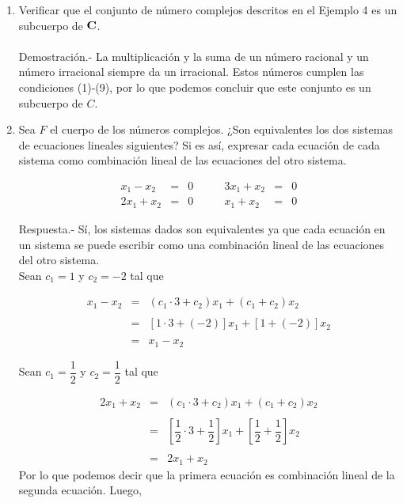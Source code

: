 \begin{enumerate}[\bfseries 1.]

    \item Verificar que el conjunto de número complejos descritos en el Ejemplo 4 es un subcuerpo de $\bf{C}$.\\\\
	Demostración.-\; La multiplicación y la suma de un número racional y un número irracional siempre da un irracional. Estos números cumplen las condiciones (1)-(9), por lo que podemos concluir que este conjunto es un subcuerpo de $C$.\\

    \item Sea $F$ el cuerpo de los números complejos. ¿Son equivalentes los dos sistemas de ecuaciones lineales siguientes? Si es así, expresar cada ecuación de cada sistema como combinación lineal de las ecuaciones del otro sistema.

    $$\begin{array}{rcl}
	x_1-x_2&=&0\\
	2x_1+x_2&=&0
    \end{array} \qquad 
    \begin{array}{rcl}
	3x_1+x_2&=&0\\
	x_1+x_2&=&0
    \end{array}$$
    \vspace{.4cm}

	Respuesta.-\; Sí, los sistemas dados son equivalentes ya que cada ecuación en un sistema se puede escribir como una combinación lineal de las ecuaciones del otro sistema.\\

	Sean $c_1=1$ y $c_2=-2$ tal que

	$$\begin{array}{rcl}
	    x_1-x_2&=&(c_1\cdot 3+ c_2)x_1 + (c_1+c_2)x_2\\\\
		   &=&\left[1\cdot 3+(-2)\right]x_1+\left[1+(-2)\right]x_2\\\\
		   &=&x_1-x_2
	\end{array}$$ 

	Sean $c_1=\dfrac{1}{2}$ y $c_2=\dfrac{1}{2}$ tal que 

	$$\begin{array}{rcl}
	    2x_1+x_2&=&(c_1\cdot 3+ c_2)x_1 + (c_1+c_2)x_2\\\\
		    &=&\left[\dfrac{1}{2}\cdot 3+\dfrac{1}{2}\right]x_1+\left[\dfrac{1}{2}+\dfrac{1}{2}\right]x_2\\\\
		    &=&2x_1+x_2
	\end{array}$$ 
	Por lo que podemos decir que la primera ecuación es combinación lineal  de la segunda ecuación. Luego,\\


\end{enumerate}
